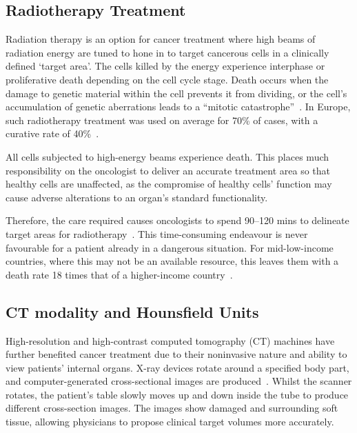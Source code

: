 \documentclass[11pt,twoside]{report}
\begin{document}
\subsection{Radiotherapy Treatment}

Radiation therapy is an option for cancer treatment where high beams of radiation energy are tuned to hone in to target cancerous cells in a clinically defined `target area'. The cells killed by the energy experience interphase or proliferative death depending on the cell cycle stage. Death occurs when the damage to genetic material within the cell prevents it from dividing, or the cell's accumulation of genetic aberrations leads to a ``mitotic catastrophe''~\cite{cell-death}. In Europe, such radiotherapy treatment was used on average for 70\% of cases, with a curative rate of 40\%~\cite{radiotherapy-advances, Thompson2018}.

All cells subjected to high-energy beams experience death. This places much responsibility on the oncologist to deliver an accurate treatment area so that healthy cells are unaffected, as the compromise of healthy cells' function may cause adverse alterations to an organ's standard functionality.


Therefore, the care required causes oncologists to spend 90--120 mins to delineate target areas for radiotherapy~\cite{LIU2020184}. This time-consuming endeavour is never favourable for a patient already in a dangerous situation. For mid-low-income countries, where this may not be an available resource, this leaves them with a death rate 18 times that of a higher-income country~\cite{cervical-cancer-epidemic}. 

\subsection{CT modality and Hounsfield Units}\label{sect:ct-modality}

High-resolution and high-contrast computed tomography (CT) machines have further benefited cancer treatment due to their noninvasive nature and ability to view patients' internal organs. X-ray devices rotate around a specified body part, and computer-generated cross-sectional images are produced~\cite{file-formats}. Whilst the scanner rotates, the patient's table slowly moves up and down inside the tube to produce different cross-section images. The images show damaged and surrounding soft tissue, allowing physicians to propose clinical target volumes more accurately.
\end{document}
